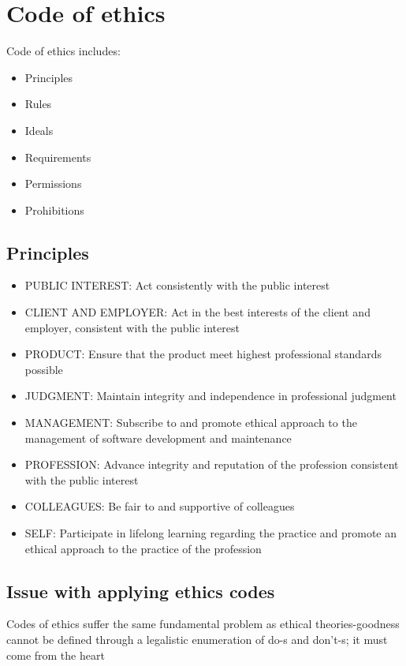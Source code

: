 \documentclass{article}
\begin{document}
\section{Code of ethics}

Code of ethics includes:
\begin{itemize}
  \item Principles
  \item Rules
  \item Ideals
  \item Requirements
  \item Permissions
  \item Prohibitions
\end{itemize}

\subsection{Principles}
\begin{itemize}
  \item PUBLIC INTEREST: Act consistently with the public interest
  \item CLIENT AND EMPLOYER: Act in the best interests of the client and employer, consistent with the public interest
  \item PRODUCT: Ensure that the product meet highest professional standards possible
  \item JUDGMENT: Maintain integrity and independence in professional judgment
  \item MANAGEMENT: Subscribe to and promote ethical approach to the management of software development and maintenance
  \item PROFESSION: Advance integrity and reputation of the profession consistent with the public interest
  \item COLLEAGUES: Be fair to and supportive of colleagues
  \item SELF: Participate in lifelong learning regarding the practice and promote an ethical approach to the practice of the profession
\end{itemize}

\subsection{Issue with applying ethics codes}
\begin{flushleft}
Codes of ethics suffer the same fundamental problem as ethical theories-goodness cannot be defined through a legalistic enumeration of do-s and don't-s; it must come from the heart
\end{flushleft}
\end{document}
